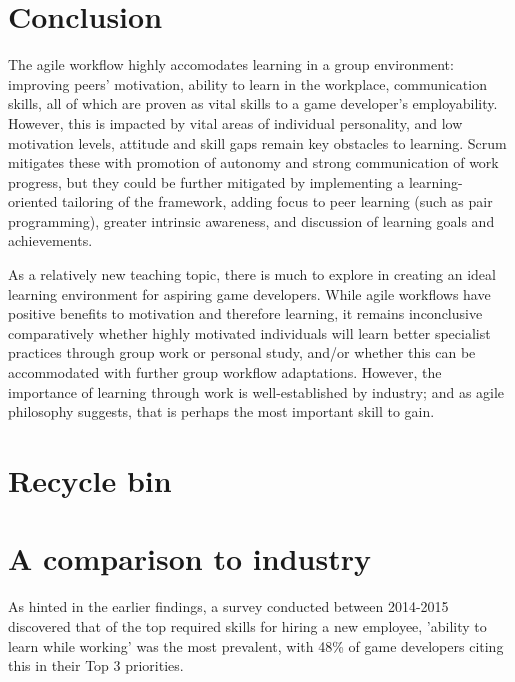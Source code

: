 \documentclass{scrartcl}
\begin{document}
\section{Conclusion}
The agile workflow highly accomodates learning in a group environment: improving peers' motivation, ability to learn in the workplace, communication skills, all of which are proven as vital skills to a game developer's employability. However, this is impacted by vital areas of individual personality, and low motivation levels, attitude and skill gaps remain key obstacles to learning. Scrum mitigates these with promotion of autonomy and strong communication of work progress, but they could be further mitigated by implementing a learning-oriented tailoring of the framework, adding focus to peer learning (such as pair programming), greater intrinsic awareness, and discussion of learning goals and achievements.

As a relatively new teaching topic, there is much to explore in creating an ideal learning environment for aspiring game developers. While agile workflows have positive benefits to motivation and therefore learning, it remains inconclusive comparatively whether highly motivated individuals will learn better specialist practices through group work or personal study, and/or whether this can be accommodated with further group workflow adaptations. However, the importance of learning through work is well-established by industry; and as agile philosophy suggests, that is perhaps the most important skill to gain.


\section{Recycle bin}
\section{A comparison to industry}
As hinted in the earlier findings, a survey conducted between 2014-2015 discovered that of the top required skills for hiring a new employee, 'ability to learn while working' \cite{devstudy} was the most prevalent, with 48\% of game developers citing this in their Top 3 priorities.

\end{document}
